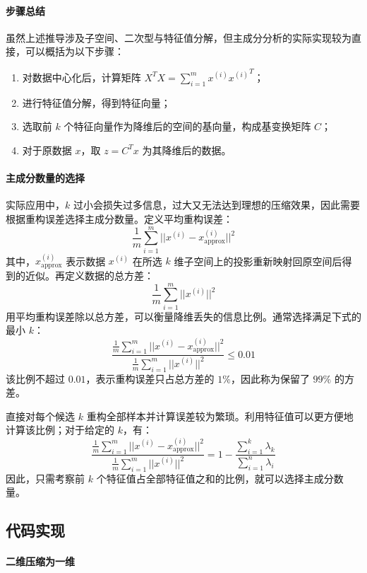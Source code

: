 \paragraph{步骤总结}

虽然上述推导涉及子空间、二次型与特征值分解，但主成分分析的实际实现较为直接，可以概括为以下步骤：

\begin{enumerate}
    \item 对数据中心化后，计算矩阵 $X^TX=\sum_{i=1}^mx^{(i)}{x^{(i)}}^T$；
    \item 进行特征值分解，得到特征向量；
    \item 选取前 $k$ 个特征向量作为降维后的空间的基向量，构成基变换矩阵 $C$；
    \item 对于原数据 $x$，取 $z=C^Tx$ 为其降维后的数据。
\end{enumerate}


\paragraph{主成分数量的选择}

实际应用中，$k$ 过小会损失过多信息，过大又无法达到理想的压缩效果，因此需要根据重构误差选择主成分数量。定义平均重构误差：
\[
\frac{1}{m}\sum_{i=1}^m||x^{(i)}-x_\text{approx}^{(i)}||^2
\]
其中，$x_\text{approx}^{(i)}$ 表示数据 $x^{(i)}$ 在所选 $k$ 维子空间上的投影重新映射回原空间后得到的近似。再定义数据的总方差：
\[
\frac{1}{m}\sum_{i=1}^m||x^{(i)}||^2
\]
用平均重构误差除以总方差，可以衡量降维丢失的信息比例。通常选择满足下式的最小 $k$：
\[
\frac{\frac{1}{m}\sum_{i=1}^m||x^{(i)}-x_\text{approx}^{(i)}||^2}{\frac{1}{m}\sum_{i=1}^m||x^{(i)}||^2}\leqslant 0.01
\]
该比例不超过 $0.01$，表示重构误差只占总方差的 $1\%$，因此称为保留了 $99\%$ 的方差。

直接对每个候选 $k$ 重构全部样本并计算误差较为繁琐。利用特征值可以更方便地计算该比例；对于给定的 $k$，有：
\[
\frac{\frac{1}{m}\sum_{i=1}^m||x^{(i)}-x_\text{approx}^{(i)}||^2}{\frac{1}{m}\sum_{i=1}^m||x^{(i)}||^2}=1-\frac{\sum_{i=1}^k\lambda_k}{\sum_{i=1}^n\lambda_i}
\]
因此，只需考察前 $k$ 个特征值占全部特征值之和的比例，就可以选择主成分数量。


\subsection{代码实现}

\paragraph{二维压缩为一维}

